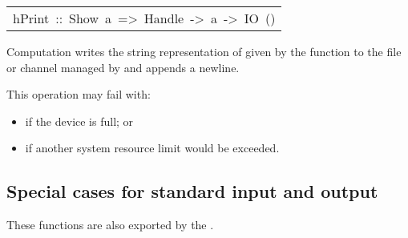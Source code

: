 \begin{haddockdesc}
\item[\begin{tabular}{@{}l}
hPrint\ ::\ Show\ a\ =>\ Handle\ ->\ a\ ->\ IO\ ()
\end{tabular}]\haddockbegindoc
Computation   writes the string representation of 
 given by the  function to the file or channel managed by 
 and appends a newline.
\par
This operation may fail with:
\par
\begin{itemize}
\item
  if the device is full; or
\par

\item
  if another system resource limit would be exceeded.
\par

\end{itemize}

\end{haddockdesc}
\subsection{Special cases for standard input and output
}
These functions are also exported by the .
\par

